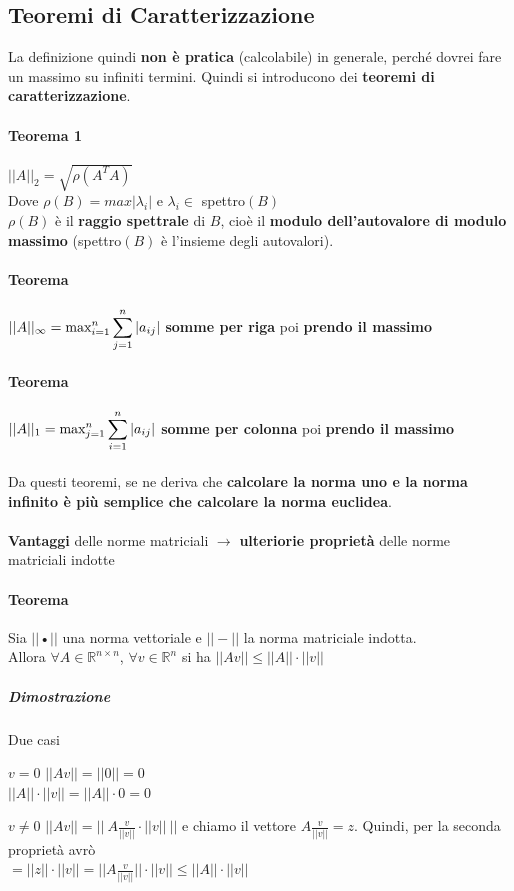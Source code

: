 \documentclass[10pt]{book}
\begin{document}
\subsection{Teoremi di Caratterizzazione}
La definizione quindi \textbf{non è pratica} (calcolabile) in generale, perché dovrei fare un massimo su infiniti termini. Quindi si introducono dei \textbf{teoremi di caratterizzazione}.
\paragraph{Teorema 1} $||A||_2 = \sqrt{\rho (A^TA)}$\\Dove $\rho(B) = max |\lambda_i|$ e $\lambda_i \in $ spettro$(B)$\\
$\rho(B)$ è il \textbf{raggio spettrale} di $B$, cioè il \textbf{modulo dell'autovalore di modulo massimo} (spettro$(B)$ è l'insieme degli autovalori).
\paragraph{Teorema} $||A||_\infty = \mathlarger{\text{max}_{i = 1}^n \sum_{j = 1}^n |a_{ij}|}$ \textbf{somme per riga} poi \textbf{prendo il massimo}
\paragraph{Teorema} $||A||_1 = \mathlarger{\text{max}_{j = 1}^n \sum_{i = 1}^n |a_{ij}|}$ \textbf{somme per colonna} poi \textbf{prendo il massimo}\\\\
Da questi teoremi, se ne deriva che \textbf{calcolare la norma uno e la norma infinito è più semplice che calcolare la norma euclidea}.\\\\
\textbf{Vantaggi} delle norme matriciali $\rightarrow$ \textbf{ulteriorie proprietà} delle norme matriciali indotte
\pagebreak
\paragraph{Teorema} Sia $||$•$||$ una norma vettoriale e $||-||$ la norma matriciale indotta.\\
Allora $\forall A \in \mathbb{R}^{n \times n}$, $\forall v \in \mathbb{R}^n$ si ha $||Av|| \leq ||A||\cdot||v||$
\subparagraph{Dimostrazione} Due casi
\begin{list}{}{}
	\item[$v = 0$] $||Av|| = ||0|| = 0$\\
	$||A||\cdot||v|| = ||A||\cdot 0 = 0$
	\item[$v \neq 0$] $||Av|| = ||\:A\frac{v}{||v||}\cdot||v||\:||$ e chiamo il vettore $A\frac{v}{||v||} = z$. Quindi, per la seconda proprietà avrò\\
	$= ||z||\cdot||v|| = ||A\frac{v}{||v||}||\cdot||v|| \leq ||A||\cdot||v||$
\end{list}
\end{document}
